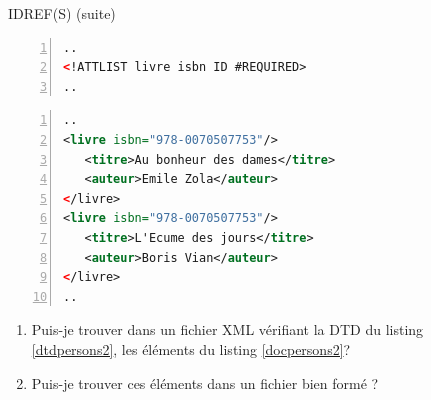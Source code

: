 \begin{frame}[containsverbatim]{IDREF(S) (suite)}
\begin{minipage}{0.7\textwidth}

\vspace{-0.5cm}
\begin{lstlisting}[basicstyle=\footnotesize, language=XML,breaklines=true,numbers=left, label={dtdpersons2}, caption={Bout de d\'eclaration dans une DTD}]
..
<!ATTLIST livre isbn ID #REQUIRED>
..
\end{lstlisting}
\end{minipage}

\vspace{-0.7cm}

\begin{flushright}
\begin{minipage}{0.5\textwidth}
\begin{lstlisting}[basicstyle=\footnotesize, language=XML,breaklines=true,numbers=left, label={docpersons2}, caption={Bout d'instance}]
..
<livre isbn="978-0070507753"/>
   <titre>Au bonheur des dames</titre>
   <auteur>Emile Zola</auteur>
</livre>
<livre isbn="978-0070507753"/>
   <titre>L'Ecume des jours</titre>
   <auteur>Boris Vian</auteur>
</livre>
..
\end{lstlisting}
\end{minipage}
\end{flushright}
 
\vspace{-0.5cm}
\begin{exoblock}
\begin{enumerate}
\item Puis-je trouver dans un fichier XML vérifiant la DTD du listing \ref{dtdpersons2}, les éléments du listing \ref{docpersons2}?
\item Puis-je trouver ces éléments dans un fichier bien formé ? 
\end{enumerate}
\end{exoblock}

\end{frame}


